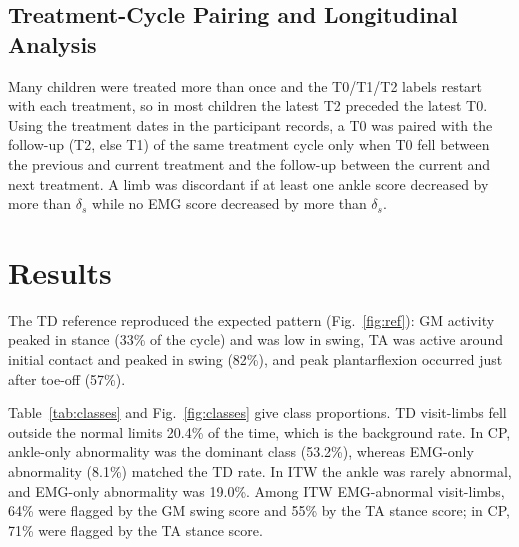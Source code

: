 \documentclass[conference]{IEEEtran}
\begin{document}
\subsection{Treatment-Cycle Pairing and Longitudinal Analysis}
Many children were treated more than once and the T0/T1/T2 labels restart with each treatment, so in most children the latest T2 preceded the latest T0. Using the treatment dates in the participant records, a T0 was paired with the follow-up (T2, else T1) of the same treatment cycle only when T0 fell between the previous and current treatment and the follow-up between the current and next treatment. A limb was discordant if at least one ankle score decreased by more than $\delta_s$ while no EMG score decreased by more than $\delta_s$.

\section{Results}
The TD reference reproduced the expected pattern (Fig.~\ref{fig:ref}): GM activity peaked in stance (33\% of the cycle) and was low in swing, TA was active around initial contact and peaked in swing (82\%), and peak plantarflexion occurred just after toe-off (57\%).


Table~\ref{tab:classes} and Fig.~\ref{fig:classes} give class proportions. TD visit-limbs fell outside the normal limits 20.4\% of the time, which is the background rate. In CP, ankle-only abnormality was the dominant class (53.2\%), whereas EMG-only abnormality (8.1\%) matched the TD rate. In ITW the ankle was rarely abnormal, and EMG-only abnormality was 19.0\%. Among ITW EMG-abnormal visit-limbs, 64\% were flagged by the GM swing score and 55\% by the TA stance score; in CP, 71\% were flagged by the TA stance score.

\begin{table}[t]
\centering
\caption{Concordance classes (\% of visit-limbs, 95\% child-bootstrap CI). $n$: visit-limbs/children; Std.: score exceeds $U_s$; Rob.: exceeds $U_s+\delta_s$}
\label{tab:classes}
\scriptsize
\setlength{\tabcolsep}{2.2pt}
\end{table}
\end{document}
